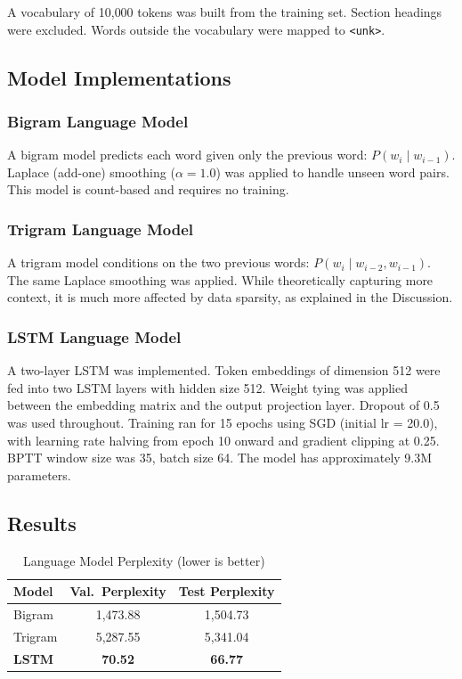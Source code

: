 \documentclass[12pt,a4paper]{article}
\begin{document}
A vocabulary of 10{,}000 tokens was built from the training set. Section
headings were excluded. Words outside the vocabulary were mapped to
\texttt{<unk>}.

\subsection{Model Implementations}

\subsubsection{Bigram Language Model}

A bigram model predicts each word given only the previous word:
$P(w_i \mid w_{i-1})$. Laplace (add-one) smoothing ($\alpha = 1.0$) was
applied to handle unseen word pairs. This model is count-based and requires
no training.

\subsubsection{Trigram Language Model}

A trigram model conditions on the two previous words:
$P(w_i \mid w_{i-2}, w_{i-1})$. The same Laplace smoothing was applied. While
theoretically capturing more context, it is much more affected by data sparsity,
as explained in the Discussion.

\subsubsection{LSTM Language Model}

A two-layer LSTM \cite{hochreiter1997lstm} was implemented. Token embeddings of
dimension 512 were fed into two LSTM layers with hidden size 512. Weight tying
was applied between the embedding matrix and the output projection layer.
Dropout of 0.5 was used throughout. Training ran for 15 epochs using SGD
(initial lr = 20.0), with learning rate halving from epoch 10 onward and
gradient clipping at 0.25. BPTT window size was 35, batch size 64. The model
has approximately 9.3M parameters.

\subsection{Results}

\begin{table}[H]
    \centering
    \caption{Language Model Perplexity (lower is better)}
    \begin{tabular}{lcc}
        \toprule
        \textbf{Model} & \textbf{Val.\ Perplexity} & \textbf{Test Perplexity} \\
        \midrule
        Bigram             & 1{,}473.88 & 1{,}504.73 \\
        Trigram            & 5{,}287.55 & 5{,}341.04 \\
        \textbf{LSTM}      & \textbf{70.52}  & \textbf{66.77}  \\
        \bottomrule
    \end{tabular}
    \label{tab:q5_results}
\end{table}
\end{document}
